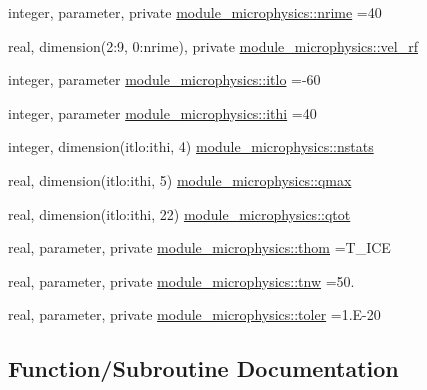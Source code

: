 \begin{DoxyCompactItemize}
\item 
integer, parameter, private \hyperlink{namespacemodule__microphysics_aaea427462ab04c90a0e8188c08e102c2}{module\+\_\+microphysics\+::nrime} =40
\item 
real, dimension(2\+:9, 0\+:nrime), private \hyperlink{namespacemodule__microphysics_a2979744b6713e1ea75813ce1329967c6}{module\+\_\+microphysics\+::vel\+\_\+rf}
\item 
integer, parameter \hyperlink{namespacemodule__microphysics_ada649157311835e0fa4c4d24057d5aa4}{module\+\_\+microphysics\+::itlo} =-\/60
\item 
integer, parameter \hyperlink{namespacemodule__microphysics_aac47e36935bcfaf088e6d0cb266d74f5}{module\+\_\+microphysics\+::ithi} =40
\item 
integer, dimension(itlo\+:ithi, 4) \hyperlink{namespacemodule__microphysics_a8893b7e5e0d04741a7e155c999480f92}{module\+\_\+microphysics\+::nstats}
\item 
real, dimension(itlo\+:ithi, 5) \hyperlink{namespacemodule__microphysics_ae783e9f9007b2cc25590b9e967461ef7}{module\+\_\+microphysics\+::qmax}
\item 
real, dimension(itlo\+:ithi, 22) \hyperlink{namespacemodule__microphysics_a1ca8e1d6e01d0b1bfb406608ccfeff5d}{module\+\_\+microphysics\+::qtot}
\item 
real, parameter, private \hyperlink{namespacemodule__microphysics_ae6cb25c6ef4d76e53988a1390c99bacb}{module\+\_\+microphysics\+::thom} =T\+\_\+\+I\+CE
\item 
real, parameter, private \hyperlink{namespacemodule__microphysics_a7759795319d20ea93e3ceb6755333fa1}{module\+\_\+microphysics\+::tnw} =50.
\item 
real, parameter, private \hyperlink{namespacemodule__microphysics_a14f276771aea75d768df7e65c93e0092}{module\+\_\+microphysics\+::toler} =1.\+E-\/20
\end{DoxyCompactItemize}


\subsection{Function/\+Subroutine Documentation}
